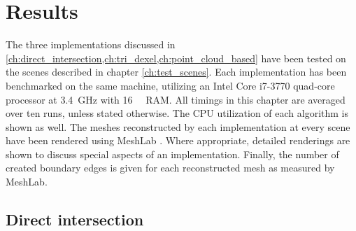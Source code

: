 
\chapter{Results}
\label{ch:results}

The three implementations discussed in \cref{ch:direct_intersection,ch:tri_dexel,ch:point_cloud_based} have been tested on the scenes described in chapter \cref{ch:test_scenes}.
Each implementation has been benchmarked on the same machine, utilizing an Intel Core i7-3770 quad-core processor at \SI{3.4}{\giga\hertz} with \SI{16}{\gibi\byte} RAM.
All timings in this chapter are averaged over ten runs, unless stated otherwise.
The CPU utilization of each algorithm is shown as well.
The meshes reconstructed by each implementation at every scene have been rendered using MeshLab \cite{meshlab}.
Where appropriate, detailed renderings are shown to discuss special aspects of an implementation.
Finally, the number of created boundary edges is given for each reconstructed mesh as measured by MeshLab.

\section{Direct intersection}
\label{sec:direct_intersection_results}

